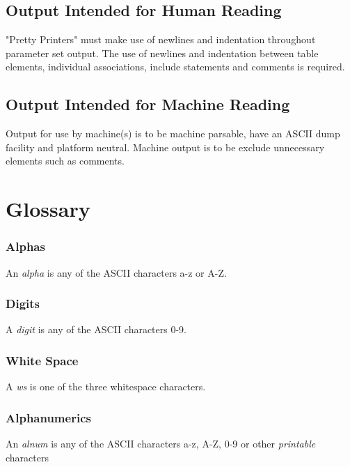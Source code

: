 \documentclass{article}
\begin{document}
        \subsection{Output Intended for Human Reading}
                "Pretty Printers" must make use of newlines and indentation throughout parameter set output.
                The use of newlines and indentation between table elements, individual associations, include statements
                and comments is required.
        \subsection{Output Intended for Machine Reading}
                Output for use by machine(s) is to be machine parsable,
                have an ASCII dump facility and platform neutral.
                Machine output is to be exclude unnecessary elements such as comments.

\section{Glossary}
                \subsubsection{Alphas}
                        An \emph{alpha} is any of the ASCII characters a-z or A-Z.
                \subsubsection{Digits}
                        A \emph{digit} is any of the ASCII characters 0-9.
                \subsubsection{White Space}
                        A \emph{ws} is one of the three whitespace characters.
                \subsubsection{Alphanumerics}
                        An \emph{alnum} is any of the ASCII characters a-z, A-Z, 0-9 or other \emph{printable} characters


\end{document}
